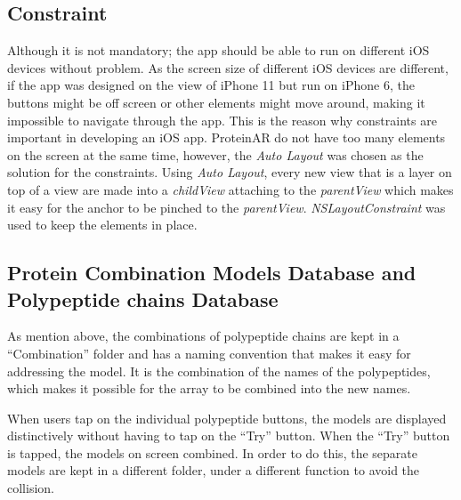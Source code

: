 \subsection{Constraint}
Although it is not mandatory; the app should be able to run on different iOS devices without problem. As the screen size of different iOS devices are different, if the app was designed on the view of iPhone 11 but run on iPhone 6, the buttons might be off screen or other elements might move around, making it impossible to navigate through the app. This is the reason why constraints are important in developing an iOS app. ProteinAR do not have too many elements on the screen at the same time, however, the \emph{Auto Layout} was chosen as the solution for the constraints. Using \emph{Auto Layout}, every new view that is a layer on top of a view are made into a \emph{childView} attaching to the \emph{parentView} which makes it easy for the anchor to be pinched to the \emph{parentView}. \emph{NSLayoutConstraint} was used to keep the elements in place. 

\subsection{Protein Combination Models Database and Polypeptide chains Database}
As mention above, the combinations of polypeptide chains are kept in a “Combination” folder and has a naming convention that makes it easy for addressing the model. It is the combination of the names of the polypeptides, which makes it possible for the array to be combined into the new names. 

When users tap on the individual polypeptide buttons, the models are displayed distinctively without having to tap on the “Try” button. When the “Try” button is tapped, the models on screen combined. In order to do this, the separate models are kept in a different folder, under a different function to avoid the collision. 

 


